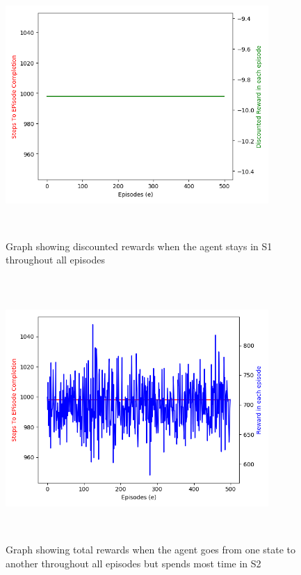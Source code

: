 \documentclass[conference]{IEEEtran}
\begin{document}
\begin{figure}[htbp]
\centerline{\includegraphics[width=10cm,height=10cm,keepaspectratio]{71-99_2.png}}
\caption{Graph showing discounted rewards when the agent stays in S1 throughout all episodes}
\label{fig}
\end{figure}

\begin{figure}[htbp]
\centerline{\includegraphics[width=10cm,height=10cm,keepaspectratio]{20-80_1.png}}
\caption{Graph showing total rewards when the agent goes from one state to another throughout all episodes but spends most time in S2}
\label{fig}
\end{figure}
\end{document}
